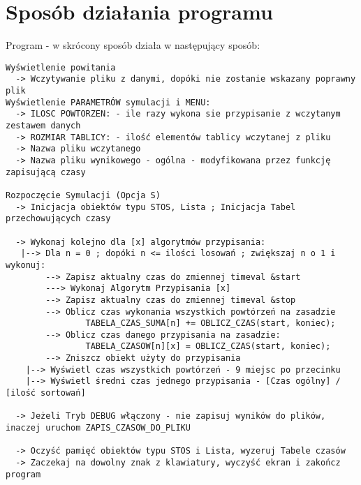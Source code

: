 \documentclass[12pt,a4paper,oneside]{article}
\begin{document}
\section{Sposób działania programu}
Program - w skrócony sposób działa w następujący sposób:
\begin{verbatim}
Wyświetlenie powitania
  -> Wczytywanie pliku z danymi, dopóki nie zostanie wskazany poprawny plik
Wyświetlenie PARAMETRÓW symulacji i MENU:
  -> ILOSC POWTORZEN: - ile razy wykona sie przypisanie z wczytanym zestawem danych
  -> ROZMIAR TABLICY: - ilość elementów tablicy wczytanej z pliku
  -> Nazwa pliku wczytanego
  -> Nazwa pliku wynikowego - ogólna - modyfikowana przez funkcję zapisującą czasy
  
Rozpoczęcie Symulacji (Opcja S)
  -> Inicjacja obiektów typu STOS, Lista ; Inicjacja Tabel przechowujących czasy

  -> Wykonaj kolejno dla [x] algorytmów przypisania:  
   |--> Dla n = 0 ; dopóki n <= ilości losowań ; zwiększaj n o 1 i wykonuj:
        --> Zapisz aktualny czas do zmiennej timeval &start
        ---> Wykonaj Algorytm Przypisania [x]
        --> Zapisz aktualny czas do zmiennej timeval &stop
        --> Oblicz czas wykonania wszystkich powtórzeń na zasadzie
                TABELA_CZAS_SUMA[n] += OBLICZ_CZAS(start, koniec);
        --> Oblicz czas danego przypisania na zasadzie:
                TABELA_CZASOW[n][x] = OBLICZ_CZAS(start, koniec);
        --> Zniszcz obiekt użyty do przypisania
  	|--> Wyświetl czas wszystkich powtórzeń - 9 miejsc po przecinku
  	|--> Wyświetl średni czas jednego przypisania - [Czas ogólny] / [ilość sortowań]
  
  -> Jeżeli Tryb DEBUG włączony - nie zapisuj wyników do plików, inaczej uruchom ZAPIS_CZASOW_DO_PLIKU
  
  -> Oczyść pamięć obiektów typu STOS i Lista, wyzeruj Tabele czasów
  -> Zaczekaj na dowolny znak z klawiatury, wyczyść ekran i zakończ program
\end{verbatim}
\newpage
\end{document}
